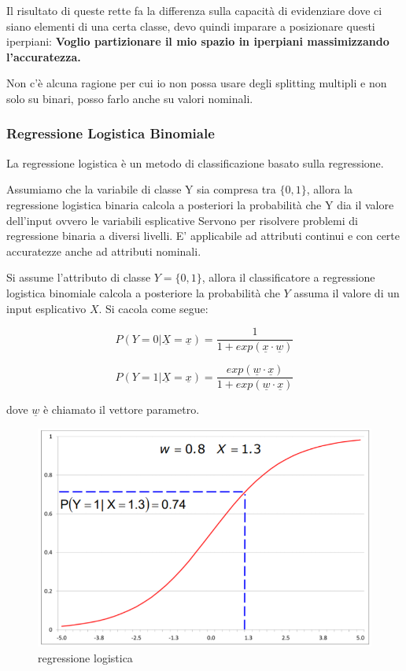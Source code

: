 Il risultato di queste rette fa la differenza sulla capacità di evidenziare dove ci siano elementi di una certa classe, devo quindi imparare a posizionare questi iperpiani: \textbf{Voglio partizionare il mio spazio in iperpiani massimizzando l'accuratezza.}

Non c'è alcuna ragione per cui io non possa usare degli splitting multipli e non solo su binari, posso farlo anche su valori nominali.

\subsubsection{Regressione Logistica Binomiale}
La regressione logistica è un metodo di classificazione basato sulla regressione.

Assumiamo che la variabile di classe Y sia compresa tra $\{0,1\}$, allora la regressione logistica binaria calcola a posteriori la probabilità che Y dia il valore dell'input ovvero le variabili esplicative 
Servono per risolvere problemi di regressione binaria a diversi livelli. E' applicabile ad attributi continui e con certe accuratezze anche ad attributi nominali.

Si assume l'attributo di classe $Y = \{0,1\}$, allora il classificatore a regressione logistica binomiale calcola a posteriore la probabilit\`a che $Y$ assuma il valore di un input esplicativo \underline{$X$}. Si cacola come segue:

\[P(Y = 0 | \underline{X}= \underline{x}) = \frac{1}{1+exp(\underline{x} \cdot \underline{w})}\]

\[P(Y = 1 | \underline{X}= \underline{x}) = \frac{exp(\underline{w} \cdot \underline{x})}{1+exp(\underline{w} \cdot \underline{x})}\]

dove $\underline{w}$ \`e chiamato il vettore parametro.

\begin{figure}[H]
	\centering
	\includegraphics[height=0.5 \linewidth]{classification/pict/regr_logistic.png}
	\caption{regressione logistica}
\end{figure}

